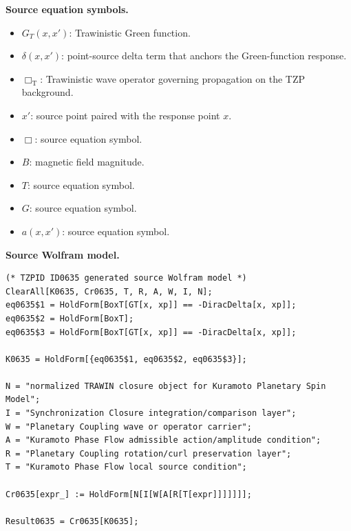 \begin{minipage}[t]{0.49\linewidth}
\begingroup
\small
\raggedright
\textbf{Source equation symbols.}\par
\begin{itemize}[leftmargin=1.35em,itemsep=1pt,topsep=1pt,parsep=0pt]
    \item $G_T(x,x')$: Trawinistic Green function.
    \item $\delta(x,x')$: point-source delta term that anchors the Green-function response.
    \item $\Box_{\mathrm{T}}$: Trawinistic wave operator governing propagation on the TZP background.
    \item $x'$: source point paired with the response point $x$.
    \item $\Box$: source equation symbol.
    \item $B$: magnetic field magnitude.
    \item $T$: source equation symbol.
    \item $G$: source equation symbol.
    \item $a(x,x')$: source equation symbol.
\end{itemize}
\endgroup
\end{minipage}\hfill
\begin{minipage}[t]{0.47\linewidth}
\begingroup
\scriptsize
\raggedright
\textbf{Source Wolfram model.}\par
\begin{Verbatim}[fontsize=\tiny,breaklines=true,breakanywhere=true]
(* TZPID ID0635 generated source Wolfram model *)
ClearAll[K0635, Cr0635, T, R, A, W, I, N];
eq0635$1 = HoldForm[BoxT[GT[x, xp]] == -DiracDelta[x, xp]];
eq0635$2 = HoldForm[BoxT];
eq0635$3 = HoldForm[BoxT[GT[x, xp]] == -DiracDelta[x, xp]];

K0635 = HoldForm[{eq0635$1, eq0635$2, eq0635$3}];

N = "normalized TRAWIN closure object for Kuramoto Planetary Spin Model";
I = "Synchronization Closure integration/comparison layer";
W = "Planetary Coupling wave or operator carrier";
A = "Kuramoto Phase Flow admissible action/amplitude condition";
R = "Planetary Coupling rotation/curl preservation layer";
T = "Kuramoto Phase Flow local source condition";

Cr0635[expr_] := HoldForm[N[I[W[A[R[T[expr]]]]]]];

Result0635 = Cr0635[K0635];
\end{Verbatim}
\endgroup
\end{minipage}

